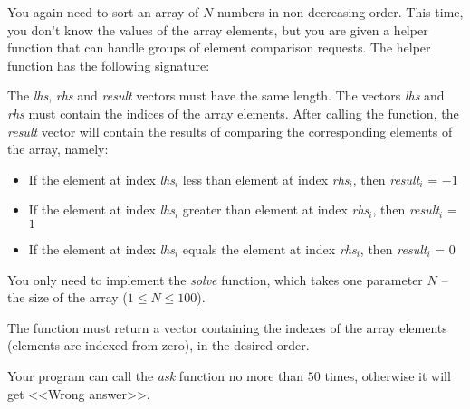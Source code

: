 \documentclass[a4paper]{article}
\begin{document}
You again need to sort an array of $N$ numbers in non-decreasing order. This time, you don't know the values of the array elements, but you are given a helper function that can handle groups of element comparison requests. The helper function has the following signature:



The \textit{lhs}, \textit{rhs} and \textit{result} vectors must have the same length. The vectors \textit{lhs} and \textit{rhs} must contain the indices of the array elements. After calling the function, the \textit{result} vector will contain the results of comparing the corresponding elements of the array, namely:
\begin{itemize}
\item If the element at index \textit{lhs}$_i$ less than element at index \textit{rhs}$_i$, then \textit{result}$_i$ = $-1$
\item If the element at index \textit{lhs}$_i$ greater than element at index \textit{rhs}$_i$, then \textit{result}$_i$ = $1$
\item If the element at index \textit{lhs}$_i$ equals the element at index \textit{rhs}$_i$, then \textit{result}$_i$ = $0$
\end{itemize}

You only need to implement the \textit{solve} function, which takes one parameter $N$ -- the size of the array ($1 \le N \le 100$).

The function must return a vector containing the indexes of the array elements (elements are indexed from zero), in the desired order.

Your program can call the \textit{ask} function no more than $50$ times, otherwise it will get <<Wrong answer>>.
\end{document}
